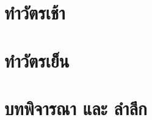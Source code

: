 

%
\part{ทำวัตรเช้า}
%
\morningChapterSettings
%

%
\morningSettingsRestore
%
%
\part{ทำวัตรเย็น}
%
\eveningChapterSettings
%

%
\eveningSettingsRestore
%

\part{บทพิจารณา และ ลำลึก}



% 
% 


%
%
%
% 
%


